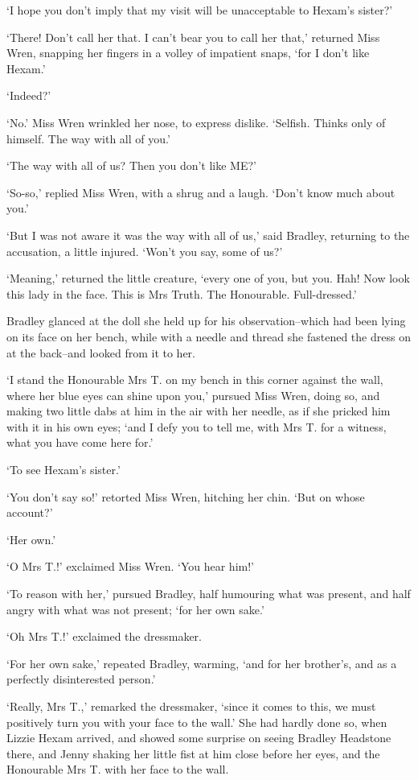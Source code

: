 ‘I hope you don’t imply that my visit will be unacceptable to Hexam’s
sister?’

‘There! Don’t call her that. I can’t bear you to call her that,’
returned Miss Wren, snapping her fingers in a volley of impatient snaps,
‘for I don’t like Hexam.’

‘Indeed?’

‘No.’ Miss Wren wrinkled her nose, to express dislike. ‘Selfish. Thinks
only of himself. The way with all of you.’

‘The way with all of us? Then you don’t like ME?’

‘So-so,’ replied Miss Wren, with a shrug and a laugh. ‘Don’t know much
about you.’

‘But I was not aware it was the way with all of us,’ said Bradley,
returning to the accusation, a little injured. ‘Won’t you say, some of
us?’

‘Meaning,’ returned the little creature, ‘every one of you, but you.
Hah! Now look this lady in the face. This is Mrs Truth. The Honourable.
Full-dressed.’

Bradley glanced at the doll she held up for his observation--which had
been lying on its face on her bench, while with a needle and thread she
fastened the dress on at the back--and looked from it to her.

‘I stand the Honourable Mrs T. on my bench in this corner against the
wall, where her blue eyes can shine upon you,’ pursued Miss Wren, doing
so, and making two little dabs at him in the air with her needle, as
if she pricked him with it in his own eyes; ‘and I defy you to tell me,
with Mrs T. for a witness, what you have come here for.’

‘To see Hexam’s sister.’

‘You don’t say so!’ retorted Miss Wren, hitching her chin. ‘But on whose
account?’

‘Her own.’

‘O Mrs T.!’ exclaimed Miss Wren. ‘You hear him!’

‘To reason with her,’ pursued Bradley, half humouring what was present,
and half angry with what was not present; ‘for her own sake.’

‘Oh Mrs T.!’ exclaimed the dressmaker.

‘For her own sake,’ repeated Bradley, warming, ‘and for her brother’s,
and as a perfectly disinterested person.’

‘Really, Mrs T.,’ remarked the dressmaker, ‘since it comes to this, we
must positively turn you with your face to the wall.’ She had hardly
done so, when Lizzie Hexam arrived, and showed some surprise on seeing
Bradley Headstone there, and Jenny shaking her little fist at him close
before her eyes, and the Honourable Mrs T. with her face to the wall.

